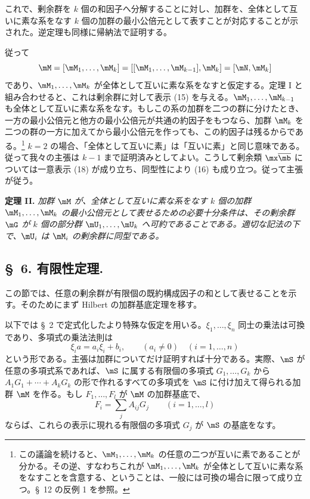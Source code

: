 \documentclass[11pt]{article}
\begin{document}
これで、剰余群を $k$ 個の和因子へ分解することに対し、加群を、全体として互いに素な系をなす $k$ 個の加群の最小公倍元として表すことが対応することが示された。逆定理も同様に帰納法で証明する。

従って
\[
 \mM=[\mM_1,\ldots,\mM_k]=[[\mM_1,\ldots,\mM_{k-1}],\mM_k]=[\mN,\mM_k]
\]
であり、$\mM_1,
\ldots,\mM_k$ が全体として互いに素な系をなすと仮定する。定理 I と組み合わせると、これは剰余群に対して表示 (15) を与える。$\mM_1,
\ldots,\mM_{k-1}$ も全体として互いに素な系をなす。もしこの系の加群を二つの群に分けたとき、一方の最小公倍元と他方の最小公倍元が共通の約因子をもつなら、加群 $\mM_k$ を二つの群の一方に加えてから最小公倍元を作っても、この約因子は残るからである。\footnote{この議論を続けると、$\mM_1,
\ldots,\mM_k$ の任意の二つが互いに素であることが分かる。その逆、すなわちこれが $\mM_1,
\ldots,\mM_k$ が全体として互いに素な系をなすことを含意する、ということは、一般には可換の場合に限って成り立つ。\S~12 の反例 1 を参照。} $k=2$ の場合、「全体として互いに素」は「互いに素」と同じ意味である。従って我々の主張は $k-1$ まで証明済みとしてよい。こうして剰余類 $\mx\overline{\mb}$ については一意表示 (18) が成り立ち、同型性により (16) も成り立つ。従って主張が従う。

\textbf{定理 II.} \emph{加群 $\mM$ が、全体として互いに素な系をなす $k$ 個の加群 $\mM_1,
\ldots,\mM_k$ の最小公倍元として表せるための必要十分条件は、その剰余群 $\mG$ が $k$ 個の部分群 $\mU_1,
\ldots,\mU_k$ へ可約であることである。適切な記法の下で、$\mU_i$ は $\mM_i$ の剰余群に同型である。}

\subsection*{\S~6. 有限性定理.}

この節では、任意の剰余群が有限個の既約構成因子の和として表せることを示す。そのためにまず Hilbert の加群基底定理を移す。

以下では \S~2 で定式化したより特殊な仮定を用いる。$\xi_1,
\ldots,\xi_n$ 同士の乗法は可換であり、多項式の乗法法則は
\begin{equation}
 \xi_i a=a_i\xi_i+b_i,
 \qquad (a_i\ne0)\quad(i=1,\ldots,n)
\tag{6}
\end{equation}
という形である。主張は加群についてだけ証明すれば十分である。実際、$\mS$ が任意の多項式系であれば、$\mS$ に属する有限個の多項式 $G_1,
\ldots,G_k$ から $A_1G_1+
\cdots+A_kG_k$ の形で作れるすべての多項式を $\mS$ に付け加えて得られる加群 $\mM$ を作る。もし $F_1,
\ldots,F_l$ が $\mM$ の加群基底で、
\[
 F_i=\sum_j A_{ij}G_j\qquad(i=1,\ldots,l)
\]
ならば、これらの表示に現れる有限個の多項式 $G_j$ が $\mS$ の基底をなす。
\end{document}
